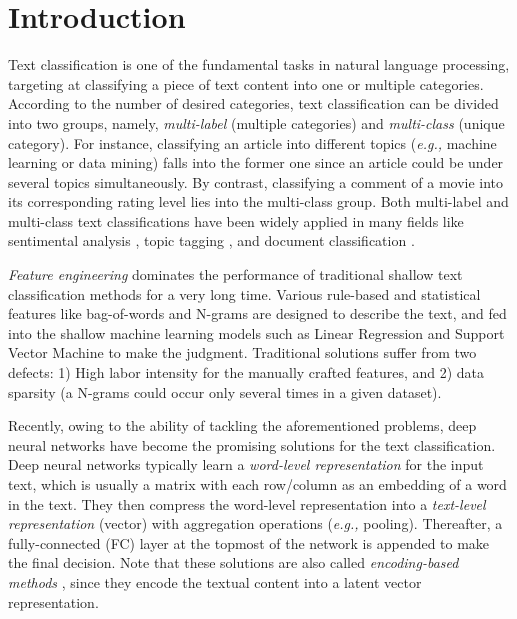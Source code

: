 \documentclass[letterpaper]{article} \usepackage{aaai19}  \usepackage{times}  \usepackage{helvet}  \usepackage{courier}  \usepackage{url}  \usepackage{graphicx}
\newcommand{\eg}{\emph{e.g., }}
\begin{document}
\section{Introduction}
Text classification is one of the fundamental tasks in natural language processing, targeting at classifying a  piece of text content into one or multiple categories. According to the number of desired categories, text classification can be divided into two groups, namely, \textit{multi-label} (multiple categories) and \textit{multi-class} (unique category). For instance, classifying an article into different topics (\eg machine learning or data mining) falls into the former one since an article could be under several topics simultaneously. By contrast, classifying a comment of a movie into its corresponding rating level lies into the multi-class group. Both multi-label and multi-class text classifications have been widely applied in many fields like sentimental analysis \cite{SenticNet}, topic tagging \cite{fasttext}, and document classification \cite{HAN}.

\textit{Feature engineering} dominates the performance of traditional shallow text classification methods for a very long time. Various rule-based and statistical features like bag-of-words \cite{bow} and N-grams \cite{ngram} are designed to describe the text, and fed into the shallow machine learning models such as Linear Regression \cite{LR} and Support Vector Machine \cite{Cortes1995SupportvectorN} to make the judgment. Traditional solutions suffer from two defects: 1) High labor intensity for the manually crafted features, and 2) data sparsity (a N-grams could occur only several times in a given dataset). 

Recently, owing to the ability of tackling the aforementioned problems, deep neural networks \cite{TextCNN,dan,vdcnn,TextRNN,fasttext} have become the promising solutions for the text classification. Deep neural networks typically learn a \textit{word-level representation} for the input text, which is usually a matrix with each row/column as an embedding of a word in the text. They then compress the word-level representation into a \textit{text-level representation} (vector) with aggregation operations (\eg pooling). Thereafter, a fully-connected (FC) layer at the topmost of the network is appended to make the final decision. Note that these solutions are also called \textit{encoding-based methods} \cite{encoder}, since they encode the textual content into a latent vector representation.
\end{document}

